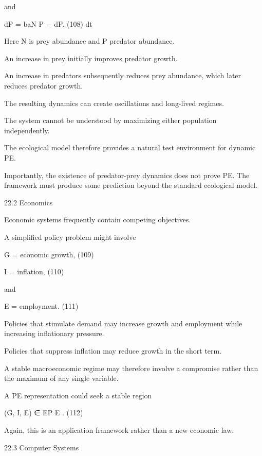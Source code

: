 \documentclass[10pt,a4paper]{article}
\begin{document}
\begin{ManuscriptText}
and

                                      dP
                                         = baN P − dP.                                   (108)
                                      dt

Here N is prey abundance and P predator abundance.

An increase in prey initially improves predator growth.

An increase in predators subsequently reduces prey abundance, which later reduces predator
growth.

The resulting dynamics can create oscillations and long-lived regimes.

The system cannot be understood by maximizing either population independently.

The ecological model therefore provides a natural test environment for dynamic PE.

Importantly, the existence of predator-prey dynamics does not prove PE. The framework must
produce some prediction beyond the standard ecological model.


22.2      Economics

Economic systems frequently contain competing objectives.

A simplified policy problem might involve


                                    G = economic growth,                                 (109)


                                        I = inflation,                                   (110)

and


                                      E = employment.                                    (111)

Policies that stimulate demand may increase growth and employment while increasing inflationary
pressure.


Policies that suppress inflation may reduce growth in the short term.

A stable macroeconomic regime may therefore involve a compromise rather than the maximum
of any single variable.

A PE representation could seek a stable region


                                        (G, I, E) ∈ EP E .                           (112)

Again, this is an application framework rather than a new economic law.


22.3    Computer Systems


\end{ManuscriptText}
\end{document}
